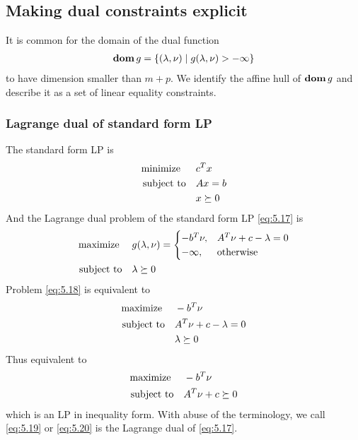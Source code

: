 \subsection{Making dual constraints explicit}
It is common for the domain of the dual function
\begin{align*}
  \mathop{\bf dom} g=\{(\lambda,\nu)\mid g(\lambda,\nu)>-\infty\}
\end{align*}
to have dimension smaller than $m + p$.
We identify the affine hull of $\mathop{\bf dom} g$ and describe it as a set of linear equality constraints.
\subsubsection{Lagrange dual of standard form LP}
The standard form LP is
\begin{align}
  \text{minimize\;\;}\quad& c^Tx\nonumber\\
  \text{subject to}  \quad& Ax=b\label{eq:5.17}\\
                          & x\succeq 0\nonumber
\end{align}
And the Lagrange dual problem of the standard form LP \eqref{eq:5.17} is
\begin{align}
  \text{maximize\;}\quad& g(\lambda,\nu)=
    \begin{cases}
      -b^T\nu, &A^T\nu+c-\lambda=0\\
      -\infty, &\text{otherwise}
    \end{cases}\label{eq:5.18}\\
  \text{subject to}\quad& \lambda\succeq 0\nonumber
\end{align}
Problem \eqref{eq:5.18} is equivalent to
\begin{align}
  \text{maximize\;}\quad& -b^T\nu\nonumber\\
  \text{subject to}\quad& A^T\nu+c-\lambda=0\label{eq:5.19}\\
                        & \lambda\succeq 0\nonumber
\end{align}
Thus equivalent to
\begin{align}
  \text{maximize\;}\quad& -b^T\nu\nonumber\\
  \text{subject to}\quad& A^T\nu+c\succeq 0\label{eq:5.20}
\end{align}
which is an LP in inequality form. With abuse of the terminology, we call \eqref{eq:5.19} or \eqref{eq:5.20} is the Lagrange dual of \eqref{eq:5.17}.


